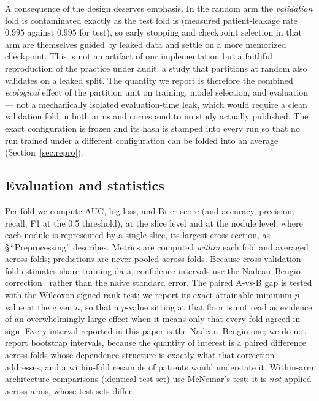 \documentclass{ieeeaccess}
\newcommand{\vcite}[1]{\cite{#1}}
\begin{document}
A consequence of the design deserves emphasis. In the random arm the \emph{validation} fold is
contaminated exactly as the test fold is (measured patient-leakage rate $0.995$ against $0.995$ for
test), so early stopping and checkpoint selection in that arm are themselves guided by leaked data
and settle on a more memorized checkpoint. This is not an artifact of our implementation but a
faithful reproduction of the practice under audit: a study that partitions at random also validates
on a leaked split. The quantity we report is therefore the combined \emph{ecological} effect of the
partition unit on training, model selection, and evaluation --- not a mechanically isolated
evaluation-time leak, which would require a clean validation fold in both arms and correspond to no
study actually published. The exact configuration is frozen and its hash is stamped into every run so that no run
trained under a different configuration can be folded into an average (Section~\ref{sec:repro}).

\subsection{Evaluation and statistics}\label{sec:eval}
Per fold we compute AUC, log-loss, and Brier score (and accuracy, precision, recall, F1 at the
0.5 threshold), at the slice level and at the nodule level, where each nodule is represented by a
single slice, its largest cross-section, as \S\,``Preprocessing'' describes. Metrics are computed \emph{within} each fold and averaged across folds; predictions are
never pooled across folds. Because cross-validation fold estimates share training data, confidence
intervals use the Nadeau--Bengio correction~\vcite{nadeau2003} rather than the naive standard
error. The paired A-vs-B gap is tested with the Wilcoxon signed-rank test; we report its exact
attainable minimum $p$-value at the given $n$, so that a $p$-value sitting at that floor is not
read as evidence of an overwhelmingly large effect when it means only that every fold agreed in
sign. Every interval reported in this paper is the Nadeau--Bengio one; we do not report
bootstrap intervals, because the quantity of interest is a paired difference across folds whose
dependence structure is exactly what that correction addresses, and a within-fold resample of
patients would understate it.
Within-arm architecture comparisons (identical test set) use McNemar's test; it is \emph{not}
applied across arms, whose test sets differ.
\end{document}

